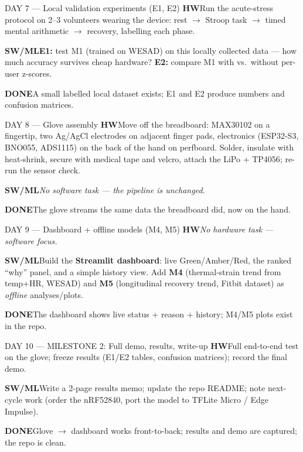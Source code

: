 \documentclass[11pt]{article}
\newcommand{\pill}[2]{\colorbox{#1}{\color{white}\footnotesize\sffamily\bfseries #2}}
\newcommand{\trk}[3]{\pill{#1}{#2}\hspace{5pt}#3\par}
\newcommand{\cardrule}{\par\vspace{3pt}{\color{black!12}\rule{\linewidth}{0.6pt}}\par\vspace{4pt}}
\begin{document}
\begin{daycard}{DAY 7 --- Local validation experiments (E1, E2)}
\trk{nsteal}{HW}{Run the acute-stress protocol on 2--3 volunteers wearing the device: rest $\to$
Stroop task $\to$ timed mental arithmetic $\to$ recovery, labelling each phase.}
\smallskip
\trk{amber}{SW/ML}{\textbf{E1:} test M1 (trained on WESAD) on this locally collected data --- how much
accuracy survives cheap hardware? \textbf{E2:} compare M1 with vs.\ without per-user z-scores.}
\cardrule
\trk{nsgreen}{DONE}{A small labelled local dataset exists; E1 and E2 produce numbers and confusion
matrices.}
\end{daycard}

\begin{daycard}{DAY 8 --- Glove assembly}
\trk{nsteal}{HW}{Move off the breadboard: MAX30102 on a fingertip, two Ag/AgCl electrodes on adjacent
finger pads, electronics (ESP32-S3, BNO055, ADS1115) on the back of the hand on perfboard. Solder,
insulate with heat-shrink, secure with medical tape and velcro, attach the LiPo + TP4056; re-run the
sensor check.}
\smallskip
\trk{nsgrey}{SW/ML}{\textit{No software task --- the pipeline is unchanged.}}
\cardrule
\trk{nsgreen}{DONE}{The glove streams the same data the breadboard did, now on the hand.}
\end{daycard}

\begin{daycard}{DAY 9 --- Dashboard + offline models (M4, M5)}
\trk{nsgrey}{HW}{\textit{No hardware task --- software focus.}}
\smallskip
\trk{amber}{SW/ML}{Build the \textbf{Streamlit dashboard}: live Green/Amber/Red, the ranked ``why''
panel, and a simple history view. Add \textbf{M4} (thermal-strain trend from temp+HR, WESAD) and
\textbf{M5} (longitudinal recovery trend, Fitbit dataset) as \emph{offline} analyses/plots.}
\cardrule
\trk{nsgreen}{DONE}{The dashboard shows live status + reason + history; M4/M5 plots exist in the repo.}
\end{daycard}

\begin{daycard}[amber]{DAY 10 --- MILESTONE 2: Full demo, results, write-up}
\trk{nsteal}{HW}{Full end-to-end test on the glove; freeze results (E1/E2 tables, confusion
matrices); record the final demo.}
\smallskip
\trk{amber}{SW/ML}{Write a 2-page results memo; update the repo README; note next-cycle work (order
the nRF52840, port the model to TFLite Micro / Edge Impulse).}
\cardrule
\trk{nsgreen}{DONE}{Glove $\to$ dashboard works front-to-back; results and demo are captured; the repo
is clean.}
\end{daycard}
\end{document}
